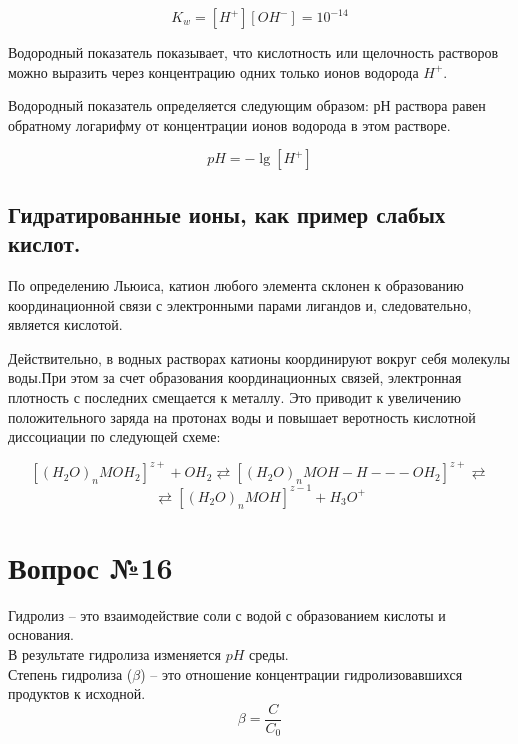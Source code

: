 \documentclass[14pt,a4paper]{scrartcl}
\begin{document}
$$K_w = \left[H^+\right]\left[OH^-\right] = 10^{-14}$$

Водородный показатель показывает, что кислотность или щелочность растворов можно выразить через концентрацию одних только ионов водорода $H^+$.

Водородный показатель определяется следующим образом: рН раствора равен обратному логарифму от концентрации ионов водорода в этом растворе.

$$pH = -\lg\left[H^+\right]$$

\subsection*{Гидратированные ионы, как пример слабых кислот.}


По определению Льюиса, катион любого элемента склонен к образованию координационной связи с электронными парами лигандов и, следовательно, является кислотой.

Действительно, в водных растворах катионы координируют вокруг себя молекулы воды.При этом за счет образования координационных связей, электронная плотность с последних смещается к металлу. Это приводит к увеличению положительного заряда на протонах воды и повышает веротность кислотной диссоциации по следующей схеме:

$$\left[(H_2O)_n MOH_2\right]^{z+} + OH_2 \rightleftarrows \left[(H_2O)_n MOH-H---OH_2\right]^{z+} \rightleftarrows $$
$$ \rightleftarrows  \left[(H_2O)_n MOH\right]^{z-1} + H_3O^+$$

\section*{Вопрос №16}
Гидролиз -- это взаимодействие соли с водой с образованием кислоты и основания.\\
В результате гидролиза изменяется $pH$ среды. \\
Степень гидролиза ($\beta$) -- это отношение концентрации гидролизовавшихся продуктов к исходной. 
$$ \beta = \dfrac{C}{C_0}  $$
\end{document}

